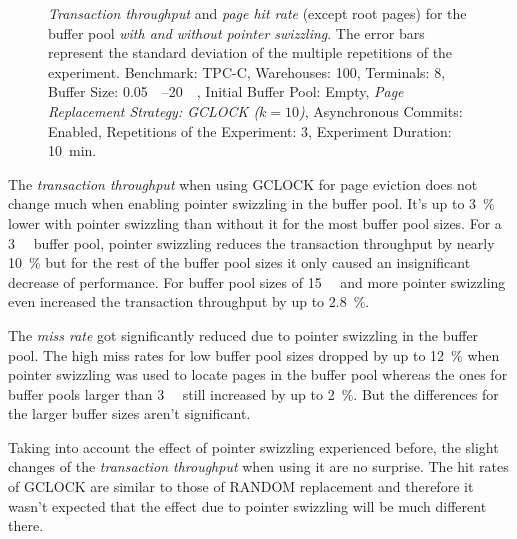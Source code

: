 \begin{@empty}
\begin{figure}[ht!]
{
		}
		\caption{\emph{Transaction throughput} and \emph{page hit rate} (except root pages) for the buffer pool \emph{with and without pointer swizzling}. The error bars represent the standard deviation of the multiple repetitions of the experiment. Benchmark: TPC-C, Warehouses: 100, Terminals: 8, Buffer Size: \SIrange{0.05}{20}{\gibi\byte}, Initial Buffer Pool: Empty, \emph{Page Replacement Strategy: GCLOCK ($k = 10$)}, Asynchronous Commits: Enabled, Repetitions of the Experiment: 3, Experiment Duration: \SI{10}{\minute}.}
		\label{fig:gclockpagereplacement}
	\end{figure}
\end{@empty}

	The \emph{transaction throughput} when using GCLOCK for page eviction does not change much when enabling pointer swizzling in the buffer pool. It's up to \SI{3}{\percent} lower with pointer swizzling than without it for the most buffer pool sizes. For a \SI{3}{\gibi\byte} buffer pool, pointer swizzling reduces the transaction throughput by nearly \SI{10}{\percent} but for the rest of the buffer pool sizes it only caused an insignificant decrease of performance. For buffer pool sizes of \SI{15}{\gibi\byte} and more pointer swizzling even increased the transaction throughput by up to \SI{2.8}{\percent}.
	
	The \emph{miss rate} got significantly reduced due to pointer swizzling in the buffer pool. The high miss rates for low buffer pool sizes dropped by up to \SI{12}{\percent} when pointer swizzling was used to locate pages in the buffer pool whereas the ones for buffer pools larger than \SI{3}{\gibi\byte} still increased by up to \SI{2}{\percent}. But the differences for the larger buffer sizes aren't significant.
	
	Taking into account the effect of pointer swizzling experienced before, the slight changes of the \emph{transaction throughput} when using it are no surprise. The hit rates of GCLOCK are similar to those of RANDOM replacement and therefore it wasn't expected that the effect due to pointer swizzling will be much different there.
	

